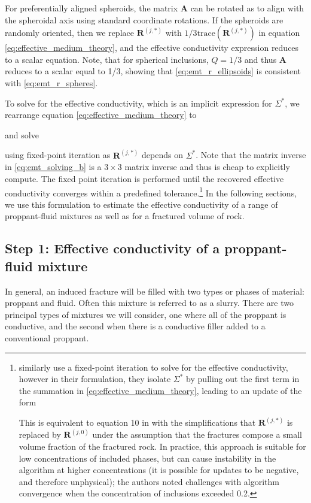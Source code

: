 
For preferentially aligned spheroids, the matrix $\mathbf{A}$ can be rotated as to align with the spheroidal axis using standard coordinate rotations. If the spheroids are randomly oriented, then we replace $\mathbf{R}^{(j,*)}$ with $1/3\text{trace}(\mathbf{R}^{(j,*)})$ in equation \ref{eq:effective_medium_theory}, and the effective conductivity expression reduces to a scalar equation. Note, that for spherical inclusions, $Q = 1/3$ and thus $\mathbf{A}$ reduces to a scalar equal to 1/3, showing that \ref{eq:emt_r_ellipsoids} is consistent with \ref{eq:emt_r_spheres}.

To solve for the effective conductivity, which is an implicit expression for $\Sigma^*$, we rearrange equation \ref{eq:effective_medium_theory} to


and solve


using fixed-point iteration as $\mathbf{R}^{(j, *)}$ depends on $\Sigma^*$. Note that the matrix inverse in \ref{eq:emt_solving_b} is a $3\times 3$ matrix inverse and thus is cheap to explicitly compute. The fixed point iteration is performed until the recovered effective conductivity converges within a predefined tolerance.\footnote{\cite{Berryman2013} similarly use a fixed-point iteration to solve for the effective conductivity, however in their formulation, they isolate $\Sigma^*$ by pulling out the first term in the summation in \ref{eq:effective_medium_theory}, leading to an update of the form


This is equivalent to equation 10 in \cite{Berryman2013} with the simplifications that $\mathbf{R}^{(j, *)}$ is replaced by $\mathbf{R}^{(j, 0)}$ under the assumption that the fractures compose a small volume fraction of the fractured rock. In practice, this approach is suitable for low concentrations of included phases, but can cause instability in the algorithm at higher concentrations (it is possible for updates to be negative, and therefore unphysical); the authors noted challenges with algorithm convergence when the concentration of inclusions exceeded 0.2.} In the following sections, we use this formulation to estimate the effective conductivity of a range of proppant-fluid mixtures as well as for a fractured volume of rock.

\subsection{Step 1: Effective conductivity of a proppant-fluid mixture}
In general, an induced fracture will be filled with two types or phases of material: proppant and fluid. Often this mixture is referred to as a slurry. There are two principal types of mixtures we will consider, one where all of the proppant is conductive, and the second when there is a conductive filler added to a conventional proppant.

